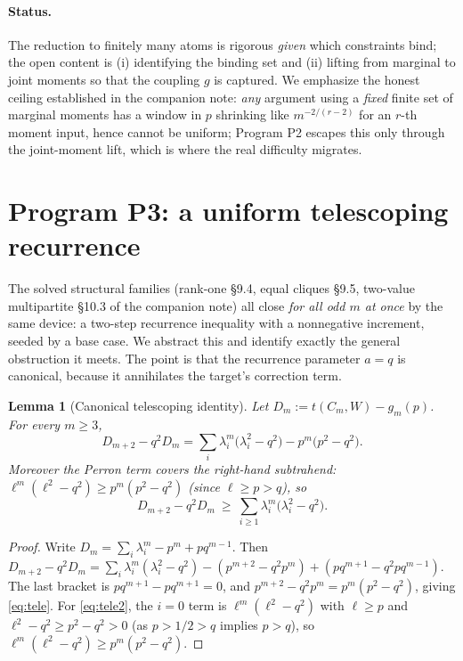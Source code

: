 \documentclass[11pt]{article}
\newtheorem{lemma}[theorem]{Lemma}
\theoremstyle{definition}
\newcommand{\1}{\mathbf{1}}
\begin{document}
\paragraph{Status.}
The reduction to finitely many atoms is rigorous \emph{given} which constraints
bind; the open content is (i) identifying the binding set and (ii) lifting from
marginal to joint moments so that the coupling $g$ is captured. We emphasize the
honest ceiling established in the companion note: \emph{any} argument using a
\emph{fixed} finite set of marginal moments has a window in $p$ shrinking like
$m^{-2/(r-2)}$ for an $r$-th moment input, hence cannot be uniform; Program P2
escapes this only through the joint-moment lift, which is where the real
difficulty migrates.

\section{Program P3: a uniform telescoping recurrence}\label{sec:telescope}

The solved structural families (rank-one \S9.4, equal cliques \S9.5, two-value
multipartite \S10.3 of the companion note) all close \emph{for all odd $m$ at
once} by the same device: a two-step recurrence inequality with a nonnegative
increment, seeded by a base case. We abstract this and identify exactly the
general obstruction it meets. The point is that the recurrence parameter $a=q$ is
canonical, because it annihilates the target's correction term.

\begin{lemma}[Canonical telescoping identity]\label{lem:tele}
Let $D_m:=t(C_m,W)-g_m(p)$. For every $m\ge3$,
\begin{equation}\label{eq:tele}
D_{m+2}-q^2D_m=\sum_i\lambda_i^m\bigl(\lambda_i^2-q^2\bigr)-p^m\bigl(p^2-q^2\bigr).
\end{equation}
Moreover the Perron term covers the right-hand subtrahend:
$\ell^m(\ell^2-q^2)\ge p^m(p^2-q^2)$ (since $\ell\ge p>q$), so
\begin{equation}\label{eq:tele2}
D_{m+2}-q^2D_m\ \ge\ \sum_{i\ge1}\lambda_i^m\bigl(\lambda_i^2-q^2\bigr).
\end{equation}
\end{lemma}

\begin{proof}
Write $D_m=\sum_i\lambda_i^m-p^m+pq^{m-1}$. Then
$D_{m+2}-q^2D_m=\sum_i\lambda_i^m(\lambda_i^2-q^2)-(p^{m+2}-q^2p^m)
+(pq^{m+1}-q^2pq^{m-1})$. The last bracket is $pq^{m+1}-pq^{m+1}=0$, and
$p^{m+2}-q^2p^m=p^m(p^2-q^2)$, giving \eqref{eq:tele}. For \eqref{eq:tele2}, the
$i=0$ term is $\ell^m(\ell^2-q^2)$ with $\ell\ge p$ and $\ell^2-q^2\ge p^2-q^2>0$
(as $p>1/2>q$ implies $p>q$), so $\ell^m(\ell^2-q^2)\ge p^m(p^2-q^2)$.
\end{proof}
\end{document}
